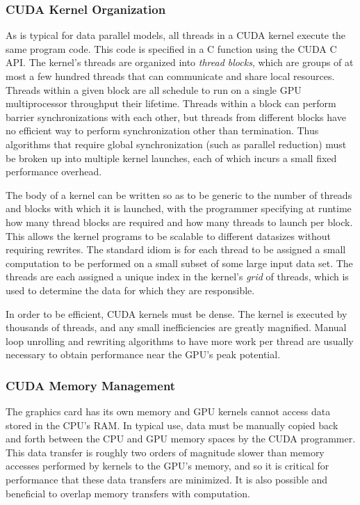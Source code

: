 \documentclass[preprint]{sigplanconf}
\begin{document}
\subsubsection{CUDA Kernel Organization}

As is typical for data parallel models, all threads in a CUDA kernel execute
the same program code.  This code is specified in a C function using the CUDA C
API. The kernel's threads are organized into {\it thread blocks}, which are
groups of at most a few hundred threads that can communicate and share local
resources. Threads within a given block are all schedule to run on a single GPU
multiprocessor throughput their lifetime.  Threads within a block can
perform barrier synchronizations with each other, but threads from different
blocks have no efficient way to perform synchronization other than termination.
Thus algorithms that require global synchronization (such as parallel reduction)
must be broken up into multiple kernel launches, each of which incurs a small
fixed performance overhead.

The body of a kernel can be written so as to be generic to the number of
threads and blocks with which it is launched, with the programmer specifying at
runtime how many thread blocks are required and how many threads to launch per
block. This allows the kernel programs to be scalable to different datasizes
without requiring rewrites. The standard idiom is for each thread to
be assigned a small computation to be performed on a small subset of some large
input data set.  The threads are each assigned a unique index in the kernel's
{\it grid} of threads, which is used to determine the data for which they are
responsible.

In order to be efficient, CUDA kernels must be dense.  The kernel is executed
by thousands of threads, and any small inefficiencies are greatly magnified.
Manual loop unrolling and rewriting algorithms to have more work per thread are
usually necessary to obtain performance near the GPU's peak potential.

\subsubsection{CUDA Memory Management}

The graphics card has its own memory and GPU kernels cannot access data stored
in the CPU's RAM.  In typical use, data must be manually copied back and forth
between the CPU and GPU memory spaces by the CUDA programmer.  This data
transfer is roughly two orders of magnitude slower than memory accesses
performed by kernels to the GPU's memory, and so it is critical for performance
that these data transfers are minimized.  It is also possible and beneficial to
overlap memory transfers with computation.
\end{document}
